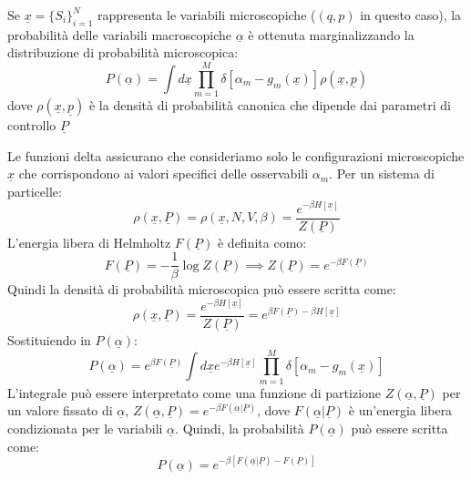 Se $\underline{x}=\{S_{i}\}_{i=1}^{N}$ rappresenta le variabili microscopiche ($(q,p)$ in questo caso), la probabilità delle variabili macroscopiche $\underline{\alpha}$ è ottenuta marginalizzando la distribuzione di probabilità microscopica:
\begin{equation}
P(\underline{\alpha})=\int d\underline{x}\prod_{m=1}^{M}\delta[\alpha_{m}-g_{m}(\underline{x})]\rho(\underline{x},\underline{p})
\end{equation}
dove $\rho(\underline{x},\underline{p})$ è la densità di probabilità canonica che dipende dai parametri di controllo $\underline{P}$

\noindent Le funzioni delta assicurano che consideriamo solo le configurazioni microscopiche $\underline{x}$ che corrispondono ai valori specifici delle osservabili $\alpha_m$.
Per un sistema di particelle:
\begin{equation} 
\rho(\underline{x},\underline{P})=\rho(\underline{x},N,V,\beta) = \frac{e^{-\beta H[\underline{x}]}}{Z(\underline{P})} 
\end{equation}
L'energia libera di Helmholtz $F(\underline{P})$ è definita como:
\begin{equation}
F(\underline{P})=-\frac{1}{\beta}\log Z(\underline{P}) \implies Z(\underline{P})=e^{-\beta F(\underline{P})}
\end{equation}
Quindi la densità di probabilità microscopica può essere scritta come:
\begin{equation}
\rho(\underline{x},\underline{P})=\frac{e^{-\beta H[\underline{x}]}}{Z(\underline{P})}=e^{\beta F(\underline{P})-\beta H[\underline{x}]}
\end{equation}
Sostituiendo in $P(\underline{\alpha})$:
\begin{equation}
P(\underline{\alpha})=e^{\beta F(\underline{P})} \int d\underline{x} e^{-\beta H[\underline{x}]} \prod_{m=1}^{M}\delta[\alpha_{m}-g_{m}(\underline{x})]
\end{equation}
L'integrale può essere interpretato come una funzione di partizione $Z(\underline{\alpha},\underline{P})$ per un valore fissato di $\underline{\alpha}$, $Z(\underline{\alpha},\underline{P}) = e^{-\beta F(\underline{\alpha}|\underline{P})}$, dove $F(\underline{\alpha}|\underline{P})$ è un'energia libera condizionata per le variabili $\underline{\alpha}$.
Quindi, la probabilità $P(\underline{\alpha})$ può essere scritta come:
\begin{equation}
P(\underline{\alpha}) = e^{-\beta[F(\underline{\alpha}|\underline{P})-F(\underline{P})]}
\end{equation}
